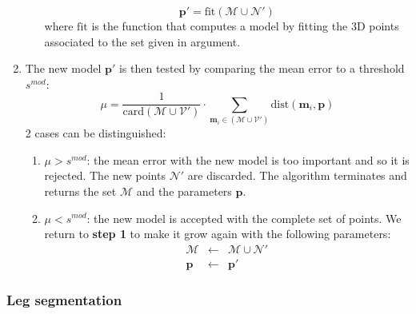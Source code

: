 \documentclass[letterpaper, 10 pt, conference]{ieeeconf}
\begin{document}
\begin{enumerate}
\begin{enumerate}
\begin{equation}
			\mathbf{p'} = \mathrm{fit}\left(\mathcal{M}\cup\mathcal{N}'\right)
		\end{equation}
		where $\mathrm{fit}$ is the function that computes a model by fitting the 3D points associated to the set given in argument.
	\end{enumerate}
	\item The new model $\mathbf{p'}$ is then tested by comparing the mean error to a threshold $s^{mod}$:
	\begin{equation}
		\mu = \frac{1}{\mathrm{card}\left(\mathcal{M}\cup\mathcal{V}'\right)}\cdot
		\sum_{\mathbf{m}_{i}\in\left(\mathcal{M}\cup\mathcal{V}'\right)} \mathrm{dist}(\mathbf{m}_i,\mathbf{p})
	\end{equation}
	2 cases can be distinguished:
	\begin{enumerate}
		\item $\mu > s^{mod}$: the mean error with the new model is too important and so it is rejected. The new points $\mathcal{N}'$ are discarded. The algorithm terminates and returns the set $\mathcal{M}$ and the parameters $\mathbf{p}$.
		\item $\mu < s^{mod}$: the new model is accepted with the complete set of points. We return to \textbf{step 1} to make it grow again with the following parameters:
		\begin{eqnarray}
			\mathcal{M}&\leftarrow&\mathcal{M}\cup\mathcal{N}'\\
			\mathbf{p} &\leftarrow& \mathbf{p}'
		\end{eqnarray}
	\end{enumerate}
\end{enumerate}

\subsubsection{Leg segmentation}~\\
\label{subsub:legSegmentation}
\end{document}
